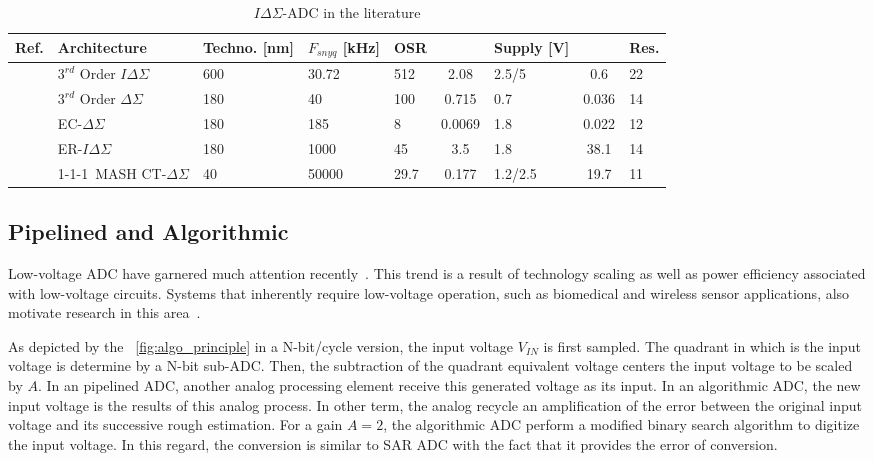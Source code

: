 \begin{table}[htp]
	\caption{\(I\Delta\Sigma \)-ADC in the literature}
	\centering
	\label{table:sigma_delta_comparison_table}
	\begin{tabular}{L{3.5\charwidth} R{16.5\charwidth} R{6\charwidth} C{5\charwidth} R{4\charwidth} S[table-format=2.2, table-column-width=6\charwidth] R{6\charwidth} S[table-format=2.2, table-column-width=6\charwidth] C{3.5\charwidth}}
	\toprule
	Ref. & Architecture & Techno. [nm] & \(F_{snyq}\) [kHz] & OSR & {} & Supply [V] & {} & Res. \\ 
	\midrule
	\cite{Quiquempoix2006} & \(3^{rd}\) Order \(I\Delta\Sigma \) & 600 & 30.72 & 512 & 2.08 & 2.5/5 & 0.6 & 22 \\
	\cite{Chae2009} & \(3^{rd}\) Order \(\Delta\Sigma \) & 180 & 40 & 100 & 0.715 & 0.7 & 0.036 & 14 \\
	\cite{Jeon2017} & EC-\(\Delta\Sigma \) & 180 & 185 & 8 & 0.0069 & 1.8 & 0.022 & 12 \\
	\cite{Agah2010} & ER-\(I\Delta\Sigma \) & 180 & 1000 & 45 & 3.5 & 1.8 & 38.1 & 14 \\
	\cite{Liu2017} & 1-1-1~MASH CT-\(\Delta\Sigma \) & 40 & 50000 & 29.7 & 0.177 & 1.2/2.5 & 19.7 & 11 \\
	\bottomrule
	\end{tabular}
\end{table}

	\subsection{Pipelined and Algorithmic}               %
	\label{sec:pipe-adc}
Low-voltage ADC have garnered much attention recently~\cite{Steyaert2012,Lee2011,SKLee2011,Brooks2009,Hershberg2012,YLim2015,YLim2015FD,Megawer2016,YCao2017}. This trend is a result of technology scaling as well as power efficiency associated with low-voltage circuits. Systems that inherently require low-voltage operation, such as
biomedical and wireless sensor applications, also motivate research in this area~\cite{Steyaert2012,Lee2011,SKLee2011}.

As depicted by the \figurename~\ref{fig:algo_principle} in a N-bit/cycle version, the input voltage \(V_{IN}\) is first sampled. The quadrant in which is the input voltage is determine by a N-bit sub-ADC\@. Then, the subtraction of the quadrant equivalent voltage centers the input voltage to be scaled by \(A\). In an pipelined ADC, another analog processing element receive this generated voltage as its input. In an algorithmic ADC, the new input voltage is the results of this analog process. In other term, the analog recycle an amplification of the error between the original input voltage and its successive rough estimation.
For a gain \(A=2\), the algorithmic ADC perform a modified binary search algorithm to digitize the input voltage. In this regard, the conversion is similar to SAR ADC with the fact that it provides the error of conversion\@.

